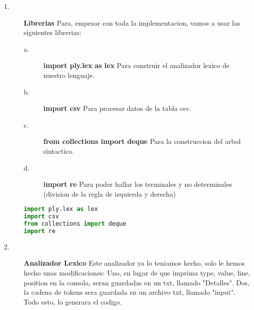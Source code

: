 \documentclass{article}
\begin{document}
\begin{description}
\item[1. ] \textbf{Librerias} Para, empezar con toda la implementacion, vamos a usar las siguientes librerias:
\begin{description}
\item[a. ] \textbf{import ply.lex as lex} Para construir el analizador lexico de nuestro lenguaje.
\item[b. ] \textbf{import csv} Para procesar datos de la tabla csv.
\item[c. ] \textbf{from collections import deque} Para la construccion del arbol sintactico.
\item[d. ] \textbf{import re} Para poder hallar los terminales y no determinales (division de la regla de izquierda y derecha)
\end{description}

\begin{lstlisting}[language=Python, caption=Ejemplo: Import's]
import ply.lex as lex
import csv
from collections import deque
import re
\end{lstlisting}
\end{description}

\begin{description}
\item[2. ] \textbf{Analizador Lexico} Este analizador ya lo teniamos hecho, solo le hemos hecho unas modificaciones: Uno, en lugar de que imprima type, value, line, position en la consola, seran guardadas en un txt, llamado "Detalles". Dos, la cadena de tokens sera guardada en un archivo txt, llamado "input". Todo esto, lo generara el codigo.
\end{description}
\end{document}
